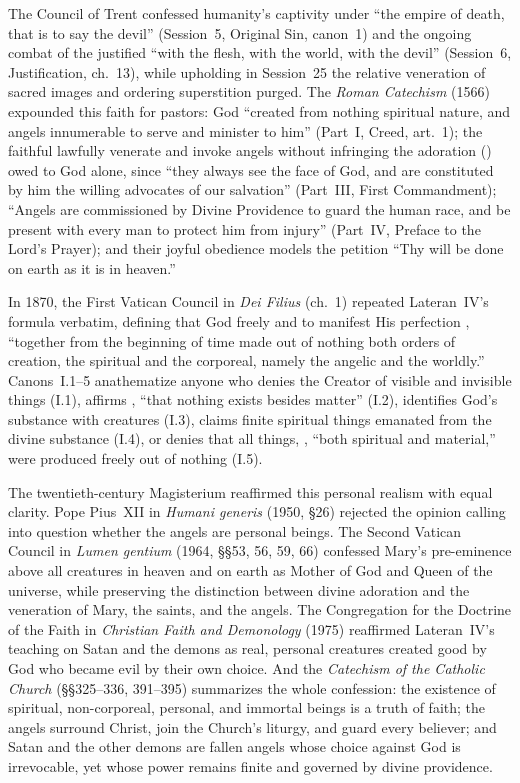 The Council of Trent confessed humanity's captivity under ``the empire of death, that is to say the devil'' (Session~5, Original Sin, canon~1) and the ongoing combat of the justified ``with the flesh, with the world, with the devil'' (Session~6, Justification, ch.~13), while upholding in Session~25 the relative veneration of sacred images and ordering superstition purged. The \emph{Roman Catechism} (1566) expounded this faith for pastors: God ``created from nothing spiritual nature, and angels innumerable to serve and minister to him'' (Part~I, Creed, art.~1); the faithful lawfully venerate and invoke angels without infringing the adoration () owed to God alone, since ``they always see the face of God, and are constituted by him the willing advocates of our salvation'' (Part~III, First Commandment); ``Angels are commissioned by Divine Providence to guard the human race, and be present with every man to protect him from injury'' (Part~IV, Preface to the Lord's Prayer); and their joyful obedience models the petition ``Thy will be done on earth as it is in heaven.''

In 1870, the First Vatican Council in \emph{Dei Filius} (ch.~1) repeated Lateran~IV's formula verbatim, defining that God freely and to manifest His perfection , ``together from the beginning of time made out of nothing both orders of creation, the spiritual and the corporeal, namely the angelic and the worldly.'' Canons~I.1--5 anathematize anyone who denies the Creator of visible and invisible things (I.1), affirms , ``that nothing exists besides matter'' (I.2), identifies God's substance with creatures (I.3), claims finite spiritual things emanated from the divine substance (I.4), or denies that all things, , ``both spiritual and material,'' were produced freely out of nothing (I.5).

The twentieth-century Magisterium reaffirmed this personal realism with equal clarity. Pope Pius~XII in \emph{Humani generis} (1950, \S 26) rejected the opinion calling into question whether the angels are personal beings. The Second Vatican Council in \emph{Lumen gentium} (1964, \S\S 53, 56, 59, 66) confessed Mary's pre-eminence above all creatures in heaven and on earth as Mother of God and Queen of the universe, while preserving the distinction between divine adoration and the veneration of Mary, the saints, and the angels. The Congregation for the Doctrine of the Faith in \emph{Christian Faith and Demonology} (1975) reaffirmed Lateran~IV's teaching on Satan and the demons as real, personal creatures created good by God who became evil by their own choice. And the \emph{Catechism of the Catholic Church} (\S\S 325--336, 391--395) summarizes the whole confession: the existence of spiritual, non-corporeal, personal, and immortal beings is a truth of faith; the angels surround Christ, join the Church's liturgy, and guard every believer; and Satan and the other demons are fallen angels whose choice against God is irrevocable, yet whose power remains finite and governed by divine providence.
